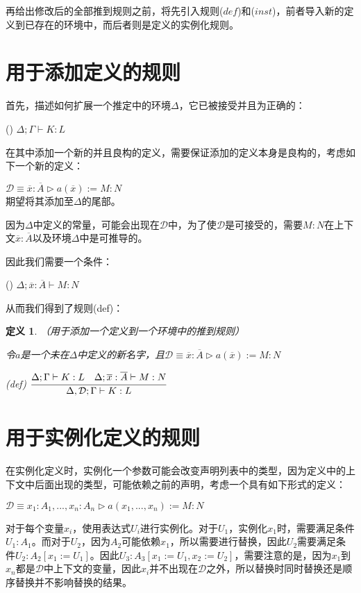\documentclass[UTF8]{article}
\newtheorem{thm}{定义}[section]
\newcommand{\rmnum}[1]{\romannumeral #1}
\begin{document}
		再给出修改后的全部推到规则之前，将先引入规则($def$)和($inst$)，前者导入新的定义到已存在的环境中，而后者则是定义的实例化规则。
		
	\section{用于添加定义的规则}
	\noindent
	首先，描述如何扩展一个推定中的环境$\Delta$，它已被接受并且为正确的：
	
		(\rmnum{1}) $\Delta;\Gamma\vdash K:L$
		
		在其中添加一个新的并且良构的定义，需要保证添加的定义本身是良构的，考虑如下一个新的定义：
		
		$\mathcal{D}\equiv\overline{x}:\overline{A}\triangleright a(\overline{x}):=M:N$\\
		期望将其添加至$\Delta$的尾部。
		
		因为$\Delta$中定义的常量，可能会出现在$\mathcal{D}$中，为了使$\mathcal{D}$是可接受的，需要$M:N$在上下文$\overline{x}:\overline{A}$以及环境$\Delta$中是可推导的。
		
		因此我们需要一个条件：
		
		(\rmnum{2}) $\Delta;\overline{x}:\overline{A}\vdash M:N$
		
		从而我们得到了规则(def)：
		
		\begin{thm}（用于添加一个定义到一个环境中的推到规则）
			
			\noindent
			令$a$是一个未在$\Delta$中定义的新名字，且$\mathcal{D}\equiv\overline{x}:\overline{A}\triangleright a(\overline{x}):=M:N$
			
			(def) $\cfrac{\Delta;\Gamma\vdash K:L\ \ \ \Delta;\overline{x}:\overline{A}\vdash M:N}{\Delta,\mathcal{D};\Gamma\vdash K:L}$
		\end{thm}

	\section{用于实例化定义的规则}
	\noindent
	在实例化定义时，实例化一个参数可能会改变声明列表中的类型，因为定义中的上下文中后面出现的类型，可能依赖之前的声明，考虑一个具有如下形式的定义：
	
		$\mathcal{D}\equiv x_1:A_1,...,x_n:A_n\triangleright a(x_1,...,x_n):=M:N$
		
		对于每个变量$x_i$，使用表达式$U_i$进行实例化。对于$U_1$，实例化$x_1$时，需要满足条件$U_1:A_1$。而对于$U_2$，因为$A_2$可能依赖$x_1$，所以需要进行替换，因此$U_2$需要满足条件$U_2:A_2\left[x_1:=U_1\right]$。因此$U_3:A_3\left[x_1:=U_1,x_2:=U_2\right]$，需要注意的是，因为$x_1$到$x_n$都是$\mathcal{D}$中上下文的变量，因此$x_i$并不出现在$\mathcal{D}$之外，所以替换时同时替换还是顺序替换并不影响替换的结果。
		
\end{document}

